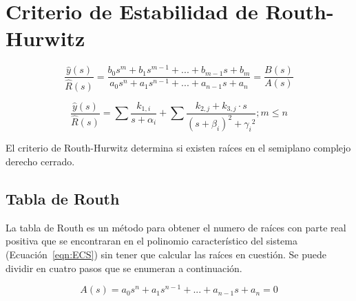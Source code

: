 
\chapter{Criterio de Estabilidad de Routh-Hurwitz}

    \begin{equation}
        \frac{\hat{y}(s)}{\hat{R}(s)} = \frac{b_0 s^m + b_1 s^{m-1} + ... + b_{m-1} s + b_m}{a_0 s^n + a_1 s^{n-1} + ... + a_{n-1} s + a_n} = \frac{B(s)}{A(s)}
    \end{equation}

    \begin{equation}
        \frac{\hat{y}(s)}{\hat{R}(s)} = \sum{\frac{k_{1,i}}{s + \alpha_i}} + \sum{\frac{k_{2,j} + k_{3,j} \cdot s}{(s + \beta_i)^2 + {\gamma_i}^2}} ; m \leq n
    \end{equation}

    El criterio de Routh-Hurwitz determina si existen raíces en el semiplano complejo derecho cerrado.

    \newpage
    \section{Tabla de Routh}
        La tabla de Routh es un método para obtener el numero de raíces con parte real positiva que se encontraran en el polinomio característico del sistema (Ecuación~\ref{eqn:ECS}) sin tener que calcular las raíces en cuestión. Se puede dividir en cuatro pasos que se enumeran a continuación.

        \begin{equation} \label{eqn:ECS}
            A(s) = a_0 s^n + a_1 s^{n-1} + ... + a_{n-1} s + a_n = 0
        \end{equation}

